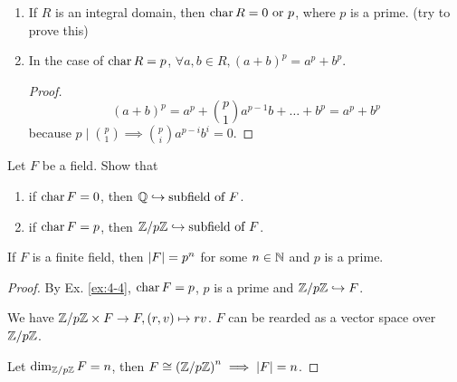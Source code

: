 \begin{prop} \mbox{}
  \begin{enumerate}
    \item If $R$ is an integral domain, then $\operatorname{char} R = 0 \text{~or~} p$,
      where $p$ is a prime. (try to prove this)
    \item In the case of $\operatorname{char} R = p$,
      $\forall a, b \in R, (a + b)^p = a^p + b^p$.
      \begin{proof}
        \[ (a+b)^p = a^p + \binom{p}{1}a^{p-1}b + \dots + b^p = a^p + b^p \]
        because $p \mid \binom{p}{1} \implies \binom{p}{i}a^{p-i}b^{i} = 0$.
      \end{proof}
  \end{enumerate}
\end{prop}

\begin{exercise}
  Let $F$ be a field. Show that
  \begin{enumerate}
    \item if $\operatorname{char} F = 0$, then $\mathbb{Q} \hookrightarrow \text{subfield of~} F$.
    \item if $\operatorname{char} F = p$, then
      ${\mathbb{Z}}/{p\mathbb{Z}} \hookrightarrow \text{subfield of~} F$.
  \end{enumerate}
  \label{ex:4-4}
\end{exercise}

\begin{theorem}
  If $F$ is a finite field, then $\lvert F\rvert = p^n$ for some $n \in \mathbb{N}$ and
  $p$ is a prime.
  \begin{proof}
    By Ex. \ref{ex:4-4}, $\operatorname{char} F = p$, $p$ is a prime and ${\mathbb{Z}}/{p\mathbb{Z}}
    \hookrightarrow F$.

    We have ${\mathbb{Z}}/{p\mathbb{Z}} \times F \to F, (r, v) \mapsto rv$.
    $F$ can be rearded as a vector space over ${\mathbb{Z}}/{p\mathbb{Z}}$.

    Let $\dim_{{\mathbb{Z}}/{p\mathbb{Z}}} F = n$, then $F \cong
    \left({\mathbb{Z}}/{p\mathbb{Z}}\right)^n \implies \lvert F\rvert = n$.
  \end{proof}
\end{theorem}


